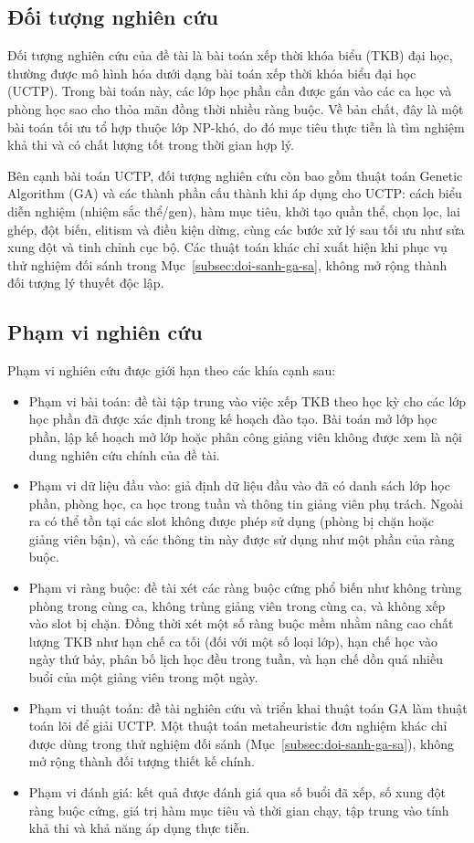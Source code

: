 \documentclass[a4paper,12pt,oneside]{article}
\begin{document}
	\subsection*{Đối tượng nghiên cứu}
	
	Đối tượng nghiên cứu của đề tài là bài toán xếp thời khóa biểu (TKB) đại học, thường được mô hình hóa dưới dạng bài toán xếp thời khóa biểu đại học (UCTP). Trong bài toán này, các lớp học phần cần được gán vào các ca học và phòng học sao cho thỏa mãn đồng thời nhiều ràng buộc. Về bản chất, đây là một bài toán tối ưu tổ hợp thuộc lớp NP-khó, do đó mục tiêu thực tiễn là tìm nghiệm khả thi và có chất lượng tốt trong thời gian hợp lý.
	
	Bên cạnh bài toán UCTP, đối tượng nghiên cứu còn bao gồm thuật toán Genetic Algorithm (GA) và các thành phần cấu thành khi áp dụng cho UCTP: cách biểu diễn nghiệm (nhiệm sắc thể/gen), hàm mục tiêu, khởi tạo quần thể, chọn lọc, lai ghép, đột biến, elitism và điều kiện dừng, cùng các bước xử lý sau tối ưu như sửa xung đột và tinh chỉnh cục bộ. Các thuật toán khác chỉ xuất hiện khi phục vụ thử nghiệm đối sánh trong Mục~\ref{subsec:doi-sanh-ga-sa}, không mở rộng thành đối tượng lý thuyết độc lập.
	
	\subsection*{Phạm vi nghiên cứu}
	
	Phạm vi nghiên cứu được giới hạn theo các khía cạnh sau:
	\begin{itemize}
		\item Phạm vi bài toán: đề tài tập trung vào việc xếp TKB theo học kỳ cho các lớp học phần đã được xác định trong kế hoạch đào tạo. Bài toán mở lớp học phần, lập kế hoạch mở lớp hoặc phân công giảng viên không được xem là nội dung nghiên cứu chính của đề tài.
		\item Phạm vi dữ liệu đầu vào: giả định dữ liệu đầu vào đã có danh sách lớp học phần, phòng học, ca học trong tuần và thông tin giảng viên phụ trách. Ngoài ra có thể tồn tại các slot không được phép sử dụng (phòng bị chặn hoặc giảng viên bận), và các thông tin này được sử dụng như một phần của ràng buộc.
		\item Phạm vi ràng buộc: đề tài xét các ràng buộc cứng phổ biến như không trùng phòng trong cùng ca, không trùng giảng viên trong cùng ca, và không xếp vào slot bị chặn. Đồng thời xét một số ràng buộc mềm nhằm nâng cao chất lượng TKB như hạn chế ca tối (đối với một số loại lớp), hạn chế học vào ngày thứ bảy, phân bố lịch học đều trong tuần, và hạn chế dồn quá nhiều buổi của một giảng viên trong một ngày.
		\item Phạm vi thuật toán: đề tài nghiên cứu và triển khai thuật toán GA làm thuật toán lõi để giải UCTP. Một thuật toán metaheuristic đơn nghiệm khác chỉ được dùng trong thử nghiệm đối sánh (Mục~\ref{subsec:doi-sanh-ga-sa}), không mở rộng thành đối tượng thiết kế chính.
		\item Phạm vi đánh giá: kết quả được đánh giá qua số buổi đã xếp, số xung đột ràng buộc cứng, giá trị hàm mục tiêu và thời gian chạy, tập trung vào tính khả thi và khả năng áp dụng thực tiễn.
	\end{itemize}
	
\end{document}
